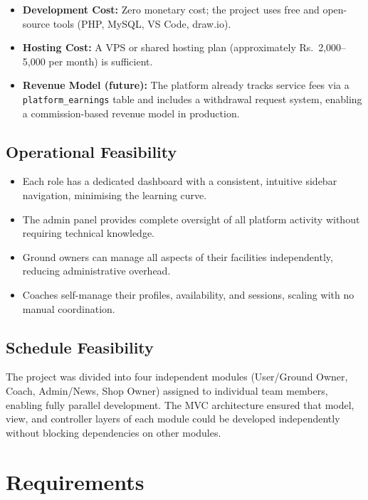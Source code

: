\documentclass[12pt,a4paper]{report}
\begin{document}
\begin{itemize}[leftmargin=1.5cm]
  \item \textbf{Development Cost:} Zero monetary cost; the project uses free and open-source tools (PHP, MySQL, VS Code, draw.io).
  \item \textbf{Hosting Cost:} A VPS or shared hosting plan (approximately Rs.\ 2,000--5,000 per month) is sufficient.
  \item \textbf{Revenue Model (future):} The platform already tracks service fees via a \texttt{platform\_earnings} table and includes a withdrawal request system, enabling a commission-based revenue model in production.
\end{itemize}

\section{Operational Feasibility}

\begin{itemize}[leftmargin=1.5cm]
  \item Each role has a dedicated dashboard with a consistent, intuitive sidebar navigation, minimising the learning curve.
  \item The admin panel provides complete oversight of all platform activity without requiring technical knowledge.
  \item Ground owners can manage all aspects of their facilities independently, reducing administrative overhead.
  \item Coaches self-manage their profiles, availability, and sessions, scaling with no manual coordination.
\end{itemize}

\section{Schedule Feasibility}

The project was divided into four independent modules (User/Ground Owner, Coach, Admin/News, Shop Owner) assigned to individual team members, enabling fully parallel development. The MVC architecture ensured that model, view, and controller layers of each module could be developed independently without blocking dependencies on other modules.

\chapter{Requirements}
\end{document}
